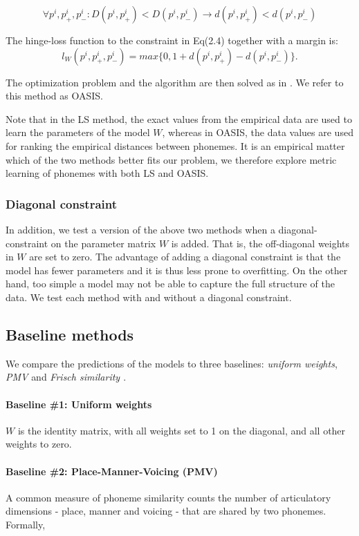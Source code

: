 \begin{equation}
\forall{p^i, p^i_+, p^i_-}: D(p^i, p^i_+)<D(p^i, p^i_-) \rightarrow d(p^i, p^i_+)<d(p^i, p^i_-)
\end{equation}

The hinge-loss function to the constraint in Eq(2.4) together with a margin is:
\begin{equation}
    l_W(p^i, p^i_+, p^i_-) = max\{0, 1 + d(p^i, p^i_+) - d(p^i, p^i_-)\}.
\end{equation}

The optimization problem and the algorithm are then solved as in \citet{Chechik2010}. We refer to this method as OASIS.

Note that in the LS method, the exact values from the empirical data are used to learn the parameters of the model $W$, whereas in OASIS, the data values are used for ranking the empirical distances between phonemes. It is an empirical matter which of the two methods better fits our problem, we therefore explore metric learning of phonemes with both LS and OASIS.

\subsubsection{Diagonal constraint} In addition, we test a version of the above two methods when a diagonal-constraint on the parameter matrix $W$ is added. That is, the off-diagonal weights in $W$ are set to zero. The advantage of adding a diagonal constraint is that the model has fewer parameters and it is thus less prone to overfitting. On the other hand, too simple a model may not be able to capture the full structure of the data. We test each method with and without a diagonal constraint. 

\subsection{Baseline methods}
We compare the predictions of the models to three baselines: \textit{uniform weights}, \textit{PMV} \citep{ladefoged2014course} and \textit{Frisch similarity \citep{Frisch1997}}.

\paragraph{Baseline \#1: Uniform weights} $W$ is the identity matrix, with all weights set to 1 on the diagonal, and all other weights to zero.

\paragraph{Baseline \#2: Place-Manner-Voicing (PMV)} A common measure of phoneme similarity counts the number of articulatory dimensions - place, manner and voicing - that are shared by two phonemes. Formally,

